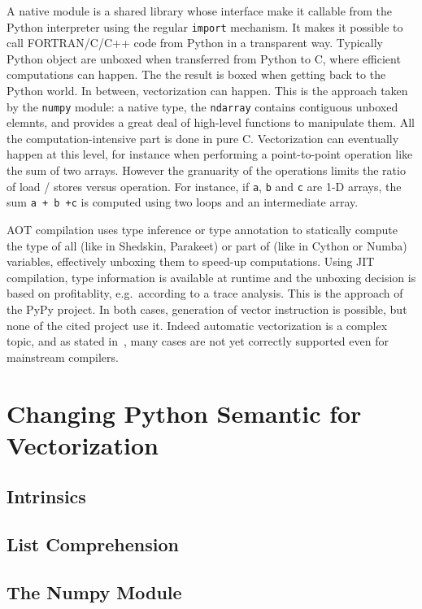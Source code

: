 \documentclass[preprint]{sigplanconf}
\begin{document}
A native module is a shared library whose interface make it callable from the
Python interpreter using the regular \texttt{import} mechanism. It makes it
possible to call FORTRAN/C/C++ code from Python in a transparent way. Typically
Python object are unboxed when transferred from Python to C, where efficient
computations can happen. The the result is boxed when getting back to the
Python world. In between, vectorization can happen.  This is the approach taken
by the \texttt{numpy} module: a native type, the \texttt{ndarray} contains
contiguous unboxed elemnts, and provides a great deal of high-level functions
to manipulate them. All the computation-intensive part is done in pure C.
Vectorization can eventually happen at this level, for instance when performing
a point-to-point operation like the sum of two arrays.  However the granuarity
of the operations limits the ratio of load / stores versus operation. For
instance, if \texttt{a}, \texttt{b} and \texttt{c} are 1-D arrays, the sum
\texttt{a + b +c} is computed using two loops and an intermediate array.

AOT compilation uses type inference or type annotation to statically compute
the type of all (like in Shedskin, Parakeet) or part of (like in Cython or
Numba) variables, effectively unboxing them to speed-up computations. Using JIT
compilation, type information is available at runtime and the unboxing decision
is based on profitablity, e.g.\ according to a trace analysis. This is the
approach of the PyPy project. In both cases, generation of vector instruction
is possible, but none of the cited project use it.  Indeed automatic
vectorization is a complex topic, and as stated in~\cite{maleki2011}, many cases
are not yet correctly supported even for mainstream compilers.


\section{Changing Python Semantic for Vectorization}

\subsection{Intrinsics}

\subsection{List Comprehension}

\subsection{The Numpy Module}
\end{document}
